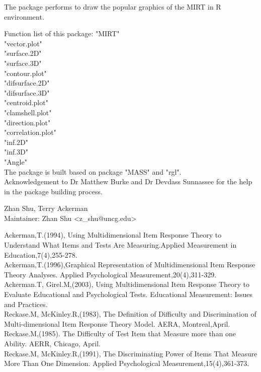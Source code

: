 \begin{Description}\relax
The package performs to draw the popular graphics of the MIRT in R environment.
\end{Description}
\begin{Details}\relax
{}
Function list of this package:
"MIRT"\\
"vector.plot"\\
"surface.2D"\\
"surface.3D"\\
"contour.plot"\\
"difsurface.2D"\\
"difsurface.3D"\\
"centroid.plot"\\
"clamshell.plot"\\
"direction.plot"\\
"correlation.plot"\\
"inf.2D"\\
"inf.3D"\\
"Angle"\\
The package is built based on package "MASS" and "rgl".\\
Acknowledgement to Dr Matthew Burke and Dr Devdass Sunnassee for the help in the package building process.
\end{Details}
\begin{Author}\relax
Zhan Shu, Terry Ackerman\\
Maintainer: Zhan Shu <z_shu@uncg.edu>
\end{Author}
\begin{References}\relax
Ackerman,T.(1994), Using Multidimensional Item Response Theory to Understand What Items and Tests Are Measuring.Applied Measurement in Education,7(4),255-278.\\
Ackerman,T.(1996),Graphical Representation of Multidimensional Item Response Theory Analyses. Applied Psychological Measurement,20(4),311-329.\\
Ackerman.T, Girel.M,(2003), Using Multidimensional Item Response Theory to Evaluate Educational and Psychological Tests. Educational Measurement: Issues and Practices.\\
Reckase.M, McKinley.R,(1983), The Definition of Difficulty and Discrimination of Multi-dimensional Item Response Theory Model. AERA, Montreal,April.\\
Reckase.M,(1985). The Difficulty of Test Item that Measure more than one Ability. AERR, Chicago, April.\\
Reckase.M, McKinley.R,(1991), The Discriminating Power of Items That Measure More Than One Dimension. Applied Psychological Measurement,15(4),361-373.
\end{References}

